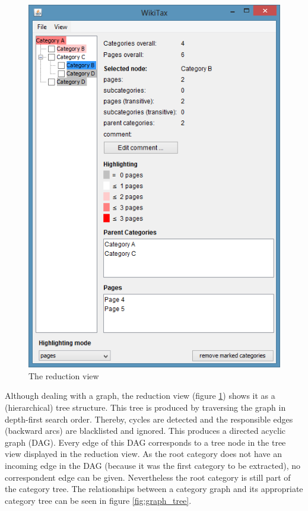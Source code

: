 \documentclass{scrartcl}
\begin{document}
\begin{figure}[ht]
\centering
\includegraphics[scale=0.5]{figures/WikiTax_selected_node.png}
\caption{The reduction view}
\label{fig:reduction_view}
\end{figure}

Although dealing with a graph, the reduction view (figure \ref{fig:reduction_view}) shows it as a (hierarchical) tree structure. This tree is produced by traversing the graph in depth-first search order. Thereby, cycles are detected and the responsible edges (backward arcs) are blacklisted and ignored. This produces a directed acyclic graph (DAG). Every edge of this DAG corresponds to a tree node in the tree view displayed in the reduction view. As the root category does not have an incoming edge in the DAG (because it was the first category to be extracted), no correspondent edge can be given. Nevertheless the root category is still part of the category tree. The relationships between a category graph and its appropriate category tree can be seen in figure \ref{fig:graph_tree}.
\end{document}
